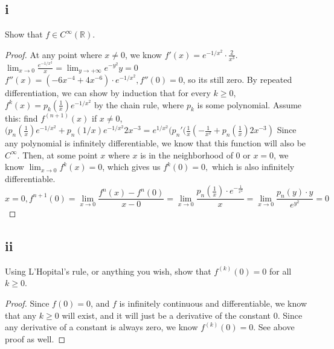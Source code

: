 \documentclass{article}
\begin{document}
\subsection*{i}
Show that $f \in C^\infty(\mathbb{R}).$ \\
\begin{proof}
 At any point where $x \neq 0$, we know $f'(x) = e^{-1/x^2} \cdot \frac{2}{x^3}$. $\lim_{x \rightarrow0} \frac{e^{-1/x^2}}{x} = \lim_{y\rightarrow +\infty}e^{-y^2}y=0$ 
 $f''(x) = (-6x^{-4}+4x^{-6})\cdot e^{-1/x^2},   f''(0) = 0$, so its still zero. By repeated differentiation, we can show by induction that for every $k \geq 0$, $f^k(x) = p_k(\frac{1}{x})e^{-1/x^2}$ by the chain rule, where $p_k$ is some polynomial. Assume this: find $f^{(n+1)}(x)$ if $x \neq 0$, $(p_n(\frac{1}{x}) e^{-1/x^2} + p_n(1/x)e^{-1/x^2}2x^{-3} = e^{1/x^2}(p_n'(\frac{1}{x}(-\frac{1}{x^2}+p_n(\frac{1}{x})2x^{-3})$
 Since any polynomial is infinitely differentiable, we know that this function will also be $C^\infty$. Then, at some point $x$ where $x$ is in the neighborhood of 0 or $x =0$, we know $\lim_{x \rightarrow 0}f^k(x)=0$, which gives us $f^k(0)= 0,$ which is also infinitely differentiable. \\

 $$x=0, f^{n+1}(0)=\lim_{x\rightarrow0}\frac{f^n(x)-f^n(0)}{x-0}=\lim_{x\rightarrow0}\frac{p_n(\frac{1}{x})\cdot e^{-\frac{1}{x^2}}}{x}=\lim_{x\rightarrow0}\frac{p_n(y)\cdot y}{e^{y^2}}=0$$
 
\end{proof}
\subsection*{ii}
Using L’Hopital’s rule, or anything you wish, show that $f^{(k)}(0) = 0$ for all $k \geq 0$. \\ 
\begin{proof}
    Since $f(0) = 0$, and $f$ is infinitely continuous and differentiable, we know that any $k \geq 0$ will exist, and it will just be a derivative of the constant 0. Since any derivative of a constant is always zero, we know  $f^{(k)}(0) = 0$. See above proof as well. 
\end{proof}

\clearpage 
\end{document}
